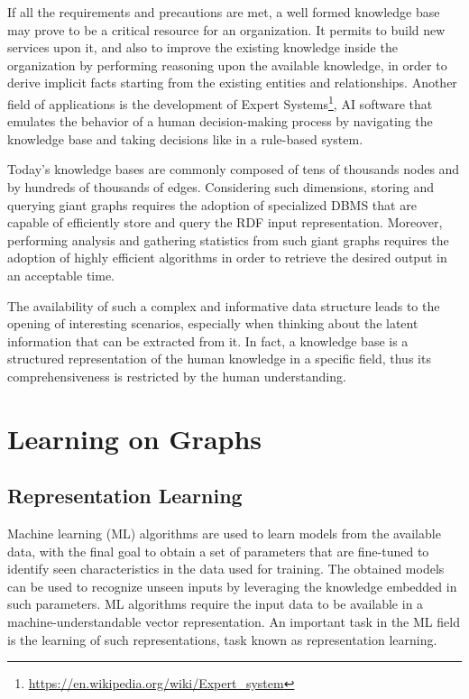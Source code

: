 \documentclass[%
    corpo=13.5pt,
    twoside,
    oldstyle,
    tipotesi=magistrale,
    greek,
    evenboxes
]{toptesi}
\begin{document}
If all the requirements and precautions are met, a well formed knowledge base may
prove to be a critical resource for an organization. It permits to
build new services upon it, and also to improve the existing knowledge inside
the organization by performing reasoning upon the available knowledge, in order
to derive implicit facts starting from the existing entities and relationships.
Another field of applications is the development of Expert Systems\footnote{\url{https://en.wikipedia.org/wiki/Expert_system}},
AI software that emulates the behavior of a human decision-making process by
navigating the knowledge base and taking decisions like in a rule-based system.

Today's knowledge bases are commonly composed of tens of
thousands nodes and by hundreds of thousands of edges.
Considering such dimensions, storing and querying giant graphs requires
the adoption of
specialized DBMS that are capable of efficiently store and query the RDF
input representation. Moreover, performing analysis and gathering statistics
from such giant graphs requires the adoption of highly efficient algorithms in
order to retrieve the desired output in an acceptable time.

The availability of such a complex and informative data structure leads
to the opening of interesting scenarios, especially when thinking about
the latent information that can be extracted from it. In
fact, a knowledge base is a structured representation of the
human knowledge in a specific field, thus its comprehensiveness is restricted
by the human understanding.


\section{Learning on Graphs}
\label{sec:learninggraphs}

\subsection{Representation Learning}

Machine learning (ML) algorithms are used to learn models from the
available data, with the final goal to obtain a set of parameters
that are fine-tuned to identify seen characteristics in the data
used for training. The obtained models can be used to
recognize unseen inputs by leveraging the knowledge embedded
in such parameters.
ML algorithms require the input data to be available in a
machine-understandable vector representation. An important task
in the ML field is the learning of such representations, task known
as representation learning.
\end{document}
